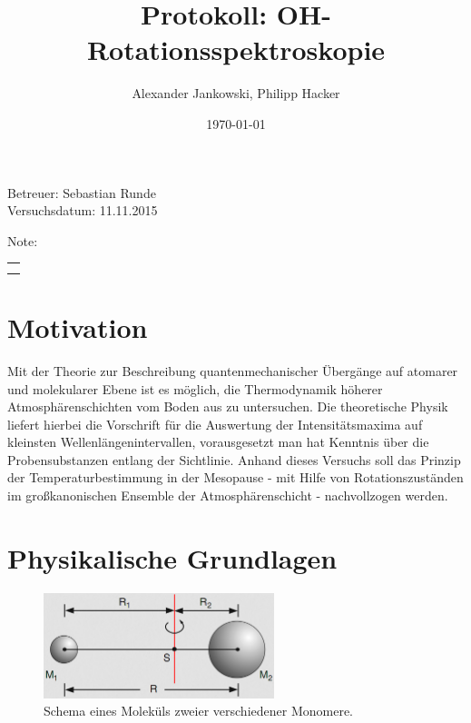 \documentclass[numbers=noenddot,a4paper,notitlepage,twoside,BCOR15mm]{scrartcl}
\title{Protokoll: OH-Rotationsspektroskopie} %
\author{Alexander Jankowski, Philipp Hacker}
\date{\today}
\begin{document}
	\maketitle
	\begin{center}
		Betreuer: Sebastian Runde\\ %
		Versuchsdatum: 11.11.2015\\ %
		\begin{table}[h]
			\centering
			Note: %
			\begin{tabularx}{1.5cm}{|X|}
				\hline \\ \\
				\hline
			\end{tabularx}
		\end{table}
	\end{center}
	\vspace*{\fill}
	\tableofcontents
	\vfill
	\clearpage
	\section{Motivation}

		Mit der Theorie zur Beschreibung quantenmechanischer Übergänge auf atomarer und molekularer Ebene ist es möglich, die Thermodynamik höherer Atmosphärenschichten vom Boden aus zu untersuchen. Die theoretische Physik liefert hierbei die Vorschrift für die Auswertung der Intensitätsmaxima auf kleinsten Wellenlängenintervallen, vorausgesetzt man hat Kenntnis über die Probensubstanzen entlang der Sichtlinie. Anhand dieses Versuchs soll das Prinzip der Temperaturbestimmung in der Mesopause - mit Hilfe von Rotationszuständen im großkanonischen Ensemble der Atmosphärenschicht - nachvollzogen werden.

	\clearpage
	\section{Physikalische Grundlagen}

			\begin{figure}[b]
				\centering
				\includegraphics[width=0.6\textwidth]{molekulrotat.png}
				\caption{Schema eines Moleküls zweier verschiedener Monomere.}
				\label{img:molekul}
			\end{figure}
\end{document}
